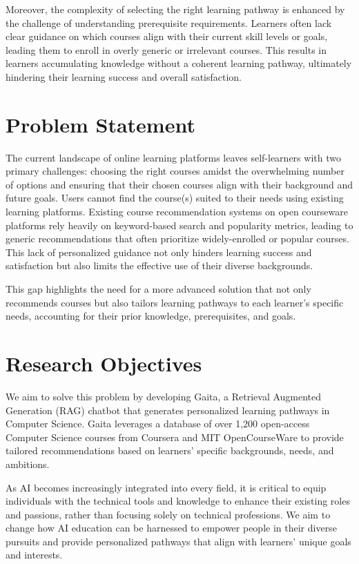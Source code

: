 Moreover, the complexity of selecting the right learning pathway is enhanced by the challenge of understanding prerequisite requirements. Learners often lack clear guidance on which courses align with their current skill levels or goals, leading them to enroll in overly generic or irrelevant courses. This results in learners accumulating knowledge without a coherent learning pathway, ultimately hindering their learning success and overall satisfaction.


\section{Problem Statement}

The current landscape of online learning platforms leaves self-learners with two primary challenges: choosing the right courses amidst the overwhelming number of options and ensuring that their chosen courses align with their background and future goals.  Users cannot find the course(s) suited to their needs using existing learning platforms. Existing course recommendation systems on open courseware platforms rely heavily on keyword-based search and popularity metrics, leading to generic recommendations that often prioritize widely-enrolled or popular courses. This lack of personalized guidance not only hinders learning success and satisfaction but also limits the effective use of their diverse backgrounds.

This gap highlights the need for a more advanced solution that not only recommends courses but also tailors learning pathways to each learner’s specific needs, accounting for their prior knowledge, prerequisites, and goals.

\section{Research Objectives}

We aim to solve this problem by developing Gaita, a Retrieval Augmented Generation (RAG) chatbot that generates personalized learning pathways in Computer Science. Gaita leverages a database of over 1,200 open-access Computer Science courses from Coursera and MIT OpenCourseWare to provide tailored recommendations based on learners’ specific backgrounds, needs, and ambitions. 

As AI becomes increasingly integrated into every field, it is critical to equip individuals with the technical tools and knowledge to enhance their existing roles and passions, rather than focusing solely on technical professions. We aim to change how AI education can be harnessed to empower people in their diverse pursuits and provide personalized pathways that align with learners’ unique goals and interests.